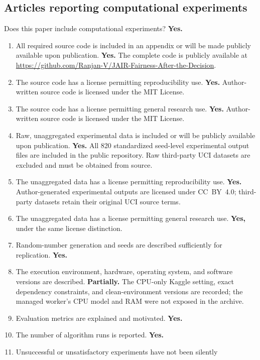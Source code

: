 \subsection*{Articles reporting computational experiments}

Does this paper include computational experiments? \textbf{Yes.}

\begin{enumerate}
  \item All required source code is included in an appendix or will be made
    publicly available upon publication. \textbf{Yes.} The complete code is
    publicly available at
    \url{https://github.com/Ranjan-V/JAIR-Fairness-After-the-Decision}.
  \item The source code has a license permitting reproducibility use.
    \textbf{Yes.} Author-written source code is licensed under the MIT License.
  \item The source code has a license permitting general research use.
    \textbf{Yes.} Author-written source code is licensed under the MIT License.
  \item Raw, unaggregated experimental data is included or will be publicly
    available upon publication. \textbf{Yes.} All 820 standardized seed-level
    experimental output files are included in the public repository. Raw
    third-party UCI datasets are excluded and must be obtained from source.
  \item The unaggregated data has a license permitting reproducibility use.
    \textbf{Yes.} Author-generated experimental outputs are licensed under
    CC~BY~4.0; third-party datasets retain their original UCI source terms.
  \item The unaggregated data has a license permitting general research use.
    \textbf{Yes,} under the same license distinction.
  \item Random-number generation and seeds are described sufficiently for
    replication. \textbf{Yes.}
  \item The execution environment, hardware, operating system, and software
    versions are described. \textbf{Partially.} The CPU-only Kaggle setting,
    exact dependency constraints, and clean-environment versions are recorded;
    the managed worker's CPU model and RAM were not exposed in the archive.
  \item Evaluation metrics are explained and motivated. \textbf{Yes.}
  \item The number of algorithm runs is reported. \textbf{Yes.}
  \item Unsuccessful or unsatisfactory experiments have not been silently

\end{enumerate}
